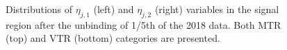 \begin{figure}[htbp]
{    }
  \caption{Distributions of $\eta_{j, 1}$ (left) and $\eta_{j, 2}$ (right) variables in the signal region after the unbinding of 1/5th of the 2018 data. Both MTR (top) and VTR (bottom) categories are presented.}
  \label{fig:jet_eta_preHornCut_2018}
\end{figure}

